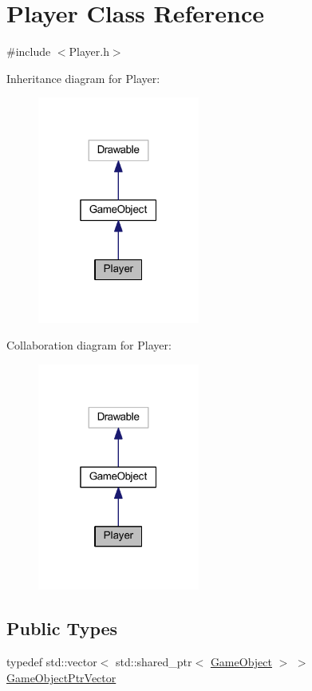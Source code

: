 \hypertarget{class_player}{}\section{Player Class Reference}
\label{class_player}


{\ttfamily \#include $<$Player.\+h$>$}



Inheritance diagram for Player\+:\nopagebreak
\begin{figure}[H]
\begin{center}
\leavevmode
\includegraphics[width=151pt]{class_player__inherit__graph}
\end{center}
\end{figure}


Collaboration diagram for Player\+:\nopagebreak
\begin{figure}[H]
\begin{center}
\leavevmode
\includegraphics[width=151pt]{class_player__coll__graph}
\end{center}
\end{figure}
\subsection*{Public Types}
\begin{DoxyCompactItemize}
\item 
typedef std\+::vector$<$ std\+::shared\+\_\+ptr$<$ \hyperlink{class_game_object}{Game\+Object} $>$ $>$ \hyperlink{class_player_a2678e391270a5e0fd6c77127657cb4d7}{Game\+Object\+Ptr\+Vector}
\end{DoxyCompactItemize}
